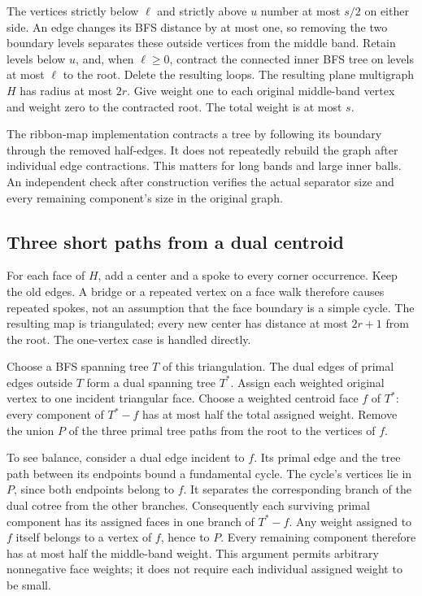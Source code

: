 The vertices strictly below $\ell$ and strictly above $u$ number at most
$s/2$ on either side.  An edge changes its BFS distance by at most one, so
removing the two boundary levels separates these outside vertices from the
middle band.  Retain levels below $u$, and, when $\ell\ge0$, contract the
connected inner BFS tree on levels at most $\ell$ to the root.  Delete the
resulting loops.  The resulting plane multigraph $H$ has radius at most
$2r$.  Give weight one to each original middle-band vertex and weight zero
to the contracted root.  The total weight is at most $s$.

The ribbon-map implementation contracts a tree by following its boundary
through the removed half-edges.  It does not repeatedly rebuild the graph
after individual edge contractions.  This matters for long bands and large
inner balls.  An independent check after construction verifies the actual
separator size and every remaining component's size in the original graph.

\subsection{Three short paths from a dual centroid}

For each face of $H$, add a center and a spoke to every corner occurrence.
Keep the old edges.  A bridge or a repeated vertex on a face walk therefore
causes repeated spokes, not an assumption that the face boundary is a simple
cycle.  The resulting map is triangulated; every new center has distance at
most $2r+1$ from the root.  The one-vertex case is handled directly.

Choose a BFS spanning tree $T$ of this triangulation.  The dual edges of
primal edges outside $T$ form a dual spanning tree $T^*$.  Assign each weighted
original vertex to one incident triangular face.  Choose a weighted centroid
face $f$ of $T^*$: every component of $T^*-f$ has at most half the total
assigned weight.  Remove the union $P$ of the three primal tree paths from
the root to the vertices of $f$.

To see balance, consider a dual edge incident to $f$.  Its primal edge and
the tree path between its endpoints bound a fundamental cycle.  The cycle's
vertices lie in $P$, since both endpoints belong to $f$.  It separates the
corresponding branch of the dual cotree from the other branches.  Consequently
each surviving primal component has its assigned faces in one branch of
$T^*-f$.  Any weight assigned to $f$ itself belongs to a vertex of $f$, hence
to $P$.  Every remaining component therefore has at most half the middle-band
weight.  This argument permits arbitrary nonnegative face weights; it does
not require each individual assigned weight to be small.

